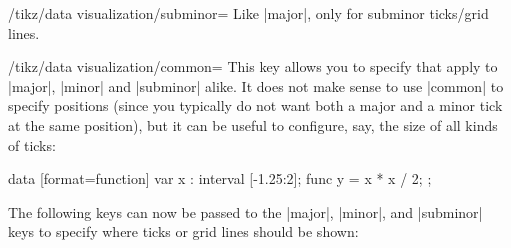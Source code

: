 \begin{key}{/tikz/data visualization/subminor=}
  Like |major|, only for subminor ticks/grid lines.
\end{key}


\begin{key}{/tikz/data visualization/common=}
  This key allows you to specify  that apply to |major|,
  |minor| and |subminor| alike. It does not make sense to use |common|
  to specify positions (since you typically do not want both a major
  and a minor tick at the same position), but it can be useful to
  configure, say, the size of all kinds of ticks:
\begin{codeexample}[]
\tikz \datavisualization
  [ school book axes, visualize as smooth line,
    x axis={ticks={minor steps between steps, common={low=0}}} ]
  data [format=function] {
    var x : interval [-1.25:2];
    func y = \value x * \value x / 2;
  };
\end{codeexample}
\end{key}


The following keys can now be passed to the |major|, |minor|, and
|subminor| keys to specify where ticks or grid lines should be shown: 

